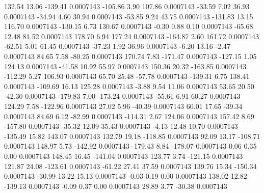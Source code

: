       132.54       13.06     -139.41     0.0007143
     -105.86        3.90      107.86     0.0007143
      -33.59        7.02       36.93     0.0007143
      -34.94        4.60       30.94     0.0007143
      -53.85        9.24       43.75     0.0007143
     -131.83       13.15      116.70     0.0007143
     -130.15        6.73      130.67     0.0007143
       -0.30        0.88        0.10     0.0007143
      -65.68       12.48       81.52     0.0007143
      178.70        6.94      177.24     0.0007143
     -164.87        2.60      161.72     0.0007143
      -62.51        5.01       61.45     0.0007143
      -37.23        1.92       36.96     0.0007143
       -6.20       13.16       -2.47     0.0007143
       84.65        7.58      -80.25     0.0007143
      170.74        7.83     -171.47     0.0007143
     -127.15        1.05      124.13     0.0007143
      -41.58       10.92       55.97     0.0007143
      150.36       20.32     -163.85     0.0007143
     -112.29        5.27      106.93     0.0007143
       65.70       25.48      -57.78     0.0007143
     -139.31        6.75      138.41     0.0007143
     -109.69       16.13      125.28     0.0007143
       -3.88        9.54       11.06     0.0007143
       53.65       20.50      -42.30     0.0007143
     -179.83        7.00     -173.24     0.0007143
      -55.61        6.91       60.27     0.0007143
      124.29        7.58     -122.96     0.0007143
       27.02        5.96      -40.39     0.0007143
       60.01       17.65      -39.34     0.0007143
       84.69        6.12      -82.99     0.0007143
     -114.31        2.67      124.06     0.0007143
      157.42        8.69     -157.80     0.0007143
      -35.32       12.09       35.43     0.0007143
       -4.13       12.48       10.70     0.0007143
     -135.49       15.82      143.07     0.0007143
      132.79       19.18     -118.85     0.0007143
       92.09       13.17     -108.71     0.0007143
      148.97        5.73     -142.92     0.0007143
     -179.43        8.84     -178.07     0.0007143
        0.06        0.35        0.00     0.0007143
      148.45       16.45     -141.04     0.0007143
      123.77        3.74     -121.15     0.0007143
      121.87       24.08     -123.61     0.0007143
      -61.22       27.41       37.59     0.0007143
      139.76       15.34     -150.34     0.0007143
      -30.99       13.22       15.13     0.0007143
       -0.03        0.19        0.00     0.0007143
      138.02       12.82     -139.13     0.0007143
       -0.09        0.37        0.00     0.0007143
       28.89        3.77      -30.38     0.0007143
